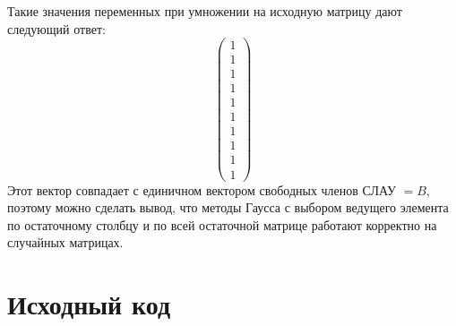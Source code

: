 \documentclass[../../report.tex]{subfiles}
\begin{document}
Такие значения переменных при умножении на исходную матрицу дают следующий ответ:
\[
\begin{pmatrix}
1 \\
1 \\
1 \\
1 \\
1 \\
1 \\
1 \\
1 \\
1 \\
1
\end{pmatrix}
\]
Этот вектор совпадает с единичном вектором свободных членов СЛАУ $= B$, поэтому можно сделать вывод, что методы Гаусса с выбором ведущего элемента по остаточному столбцу и по всей остаточной матрице работают корректно на случайных матрицах.

\section{Исходный код}
\end{document}
